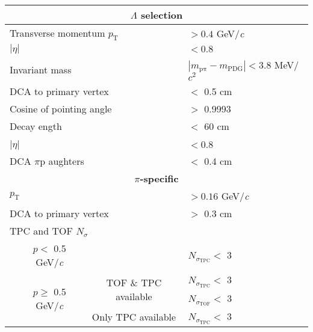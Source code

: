 \documentclass[ALICE,manyauthors]{cernphprep}
\newcommand{\Lam}{$\Lambda$\xspace}
\begin{document}
\begin{table}[htbp]
 \centering 
 \caption{{\color{blue}{\Lam selection criteria}}}
  \renewcommand{\arraystretch}{1.05}
  \begin{tabular}{lc|c|l}
   \hline  
   \multicolumn{4}{c}{\textbf{\Lam selection}} \\
   \hline
   \multicolumn{3}{l|}{Transverse momentum $p_{\mathrm{T}}$} & $> 0.4$ GeV/\textit{c} \\
   \hline
   \multicolumn{3}{l|}{$|\eta|$} & $< 0.8$ \\
   \hline
   \multicolumn{3}{l|}{Invariant mass} & $|m_{\mathrm{\mathrm{p}\pi}} - m_{\mathrm{PDG}}| < 3.8$ MeV/$c^{2}$ \\ 
   \hline
   \multicolumn{3}{l|}{DCA to primary vertex} & $<$ 0.5 cm \\
   \hline
   \multicolumn{3}{l|}{Cosine of pointing angle} & $>$ 0.9993 \\
   \hline
   \multicolumn{3}{l|}{Decay {\color{red}{L}}{\color{blue}{l}}ength} & $<$ 60 cm \\
   \hline
   
   
   \multicolumn{4}{c}{\textbf{{\color{red}{Daughter Cuts ($\pi$ and p)}} {\color{blue}{$\pi$ and p daughter criteria}}}} \\
   \hline
   \multicolumn{3}{l|}{$|\eta|$} &  $< 0.8$ \\
   \hline
   \multicolumn{3}{l|}{DCA $\pi$p {\color{red}{D}}{\color{blue}{d}}aughters} & $<$ 0.4 cm \\
   \hline
   
   
   \multicolumn{4}{c}{\textbf{$\pi$-specific {\color{red}{cuts}}}} \\
   \hline
   \multicolumn{3}{l|}{$p_{\mathrm{T}}$} & $> 0.16$ GeV/\textit{c} \\
   \hline
   \multicolumn{3}{l|}{DCA to primary vertex} & $>$ 0.3 cm \\
   \hline
   \multicolumn{4}{l}{TPC and TOF $N_{\sigma}$ {\color{red}{Cuts}}} \\
   \cline{2-4}
    & \multicolumn{1}{c}{$p <$ 0.5 GeV/\textit{c}} &  & $N_{\sigma_{\mathrm{TPC}}} <$ 3 \\
   \cline{2-4}
    & \multicolumn{1}{c}{\multirow{3}{*}{$p \geq$ 0.5 GeV/\textit{c}}} &  \multirow{2}{*}{TOF \& TPC available} & $N_{\sigma_{\mathrm{TPC}}} <$ 3 \\
    & \multicolumn{2}{c|}{} & $N_{\sigma_{\mathrm{TOF}}} <$ 3 \\
   \cline{3-4}
    & \multicolumn{1}{c}{} & Only TPC available & $N_{\sigma_{\mathrm{TPC}}} <$ 3 \\
   \hline
   

\end{tabular}
\end{table}
\end{document}

